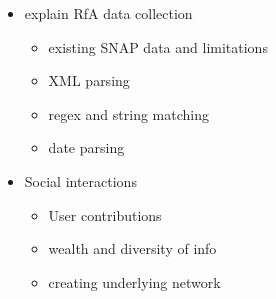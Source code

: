 \begin{itemize}
    \item explain RfA data collection 
    \begin{itemize}
        \item existing SNAP data and limitations
        \item XML parsing 
        \item regex and string matching 
        \item date parsing
    \end{itemize}
    \item Social interactions 
    \begin{itemize}
        \item User contributions
        \item wealth and diversity of info 
        \item creating underlying network
    \end{itemize}
\end{itemize}